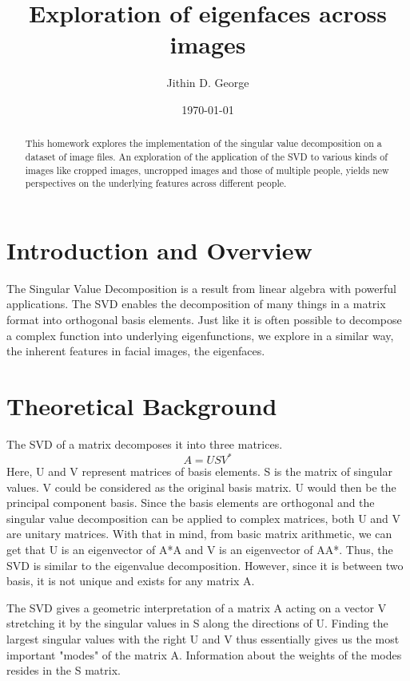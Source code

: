 \documentclass[a4paper]{article}
\title{Exploration of eigenfaces across images}
\author{Jithin D. George}
\date{\today}
\begin{document}
\maketitle

\begin{abstract}
This homework explores the implementation of the singular value decomposition on a dataset of image files. An exploration of the application of the SVD to various kinds of images like cropped images, uncropped images and those of multiple people, yields new perspectives on the underlying features across different people.
\end{abstract}

\section{Introduction and Overview}
\label{sec:introduction}

The Singular Value Decomposition is a result from linear algebra with powerful applications. The SVD enables the decomposition of many things in a matrix format into orthogonal basis elements. Just like it is often possible to decompose a complex function into underlying eigenfunctions, we explore in a similar way, the inherent features in facial images, the eigenfaces.
 
\section{Theoretical Background}
\label{sec:theory}


The SVD of a matrix decomposes it into three matrices.
\[A=USV^{*} \]
Here, U and V represent matrices of basis elements. S is the matrix of singular values. V could be considered as the original basis matrix. U would then be the principal component basis. Since the basis elements are orthogonal and the singular value decomposition can be applied to complex matrices, both U and V are unitary matrices. With that in mind, from basic matrix arithmetic, we can get that U is an eigenvector of A*A and V is an eigenvector of AA*. Thus, the SVD is similar to the eigenvalue decomposition. However, since it is between two basis, it is not unique and exists for any matrix A.

The SVD gives a geometric interpretation of a matrix A acting on a vector V stretching it by the singular values in S along the directions of U. Finding the largest singular values with the right U and V thus essentially gives us the most important "modes" of the matrix A. Information about the weights of the modes resides in the S matrix.
\end{document}
